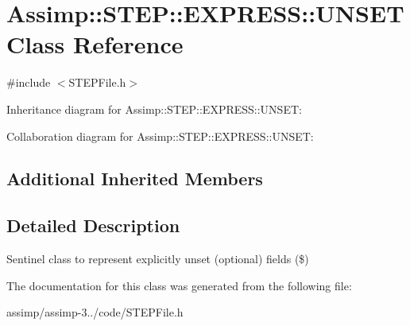 \hypertarget{class_assimp_1_1_s_t_e_p_1_1_e_x_p_r_e_s_s_1_1_u_n_s_e_t}{\section{Assimp\+:\+:S\+T\+E\+P\+:\+:E\+X\+P\+R\+E\+S\+S\+:\+:U\+N\+S\+E\+T Class Reference}
\label{class_assimp_1_1_s_t_e_p_1_1_e_x_p_r_e_s_s_1_1_u_n_s_e_t}
}


{\ttfamily \#include $<$S\+T\+E\+P\+File.\+h$>$}



Inheritance diagram for Assimp\+:\+:S\+T\+E\+P\+:\+:E\+X\+P\+R\+E\+S\+S\+:\+:U\+N\+S\+E\+T\+:


Collaboration diagram for Assimp\+:\+:S\+T\+E\+P\+:\+:E\+X\+P\+R\+E\+S\+S\+:\+:U\+N\+S\+E\+T\+:
\subsection*{Additional Inherited Members}


\subsection{Detailed Description}
Sentinel class to represent explicitly unset (optional) fields (\$) 

The documentation for this class was generated from the following file\+:\begin{DoxyCompactItemize}
\item 
assimp/assimp-\/3../code/S\+T\+E\+P\+File.\+h\end{DoxyCompactItemize}
